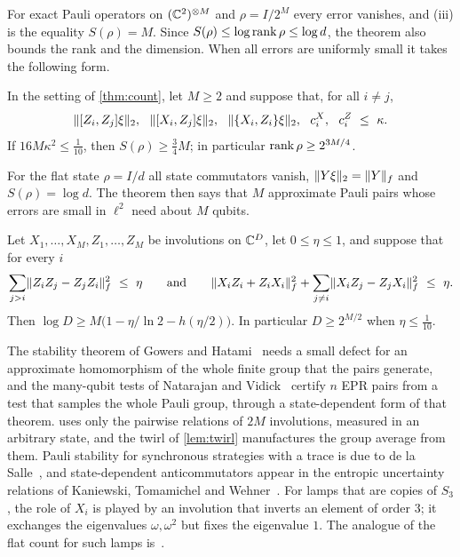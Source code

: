 For exact Pauli operators on $(\mathbb C^2)^{\otimes M}$ and $\rho=I/2^M$ every error vanishes, and (iii) is the equality $S(\rho)=M$. Since
$S(\rho)\le\log\operatorname{rank}\rho\le\log d$, the theorem also bounds the rank and the dimension. When all errors are uniformly small it takes the
following form.

\begin{corollary}\label{cor:count}
In the setting of \cref{thm:count}, let $M\ge2$ and suppose that, for all $i\ne j$,
\[
\hs{[Z_i,Z_j]\xi},\ \ \hs{[X_i,Z_j]\xi},\ \ \hs{\{X_i,Z_i\}\xi},\ \ c^X_i,\ \ c^Z_i\ \le\ \kappa .
\]
If $16M\kappa^2\le\frac1{10}$, then $S(\rho)\ge\frac34M$; in particular $\operatorname{rank}\rho\ge2^{3M/4}$.
\end{corollary}

For the flat state $\rho=I/d$ all state commutators vanish, $\lVert Y\xi\rVert_2=\lVert Y\rVert_f$ and $S(\rho)=\log d$. The theorem then says that $M$
approximate Pauli pairs whose errors are small in $\ell^2$ need about $M$ qubits.

\begin{corollary}\label{cor:count-flat}
Let $X_1,\dots,X_M,Z_1,\dots,Z_M$ be involutions on $\mathbb C^D$, let $0\le\eta\le1$, and suppose that for every $i$
\[
\sum_{j>i}\fn{Z_iZ_j-Z_jZ_i}^2\ \le\ \eta\qquad\text{and}\qquad\fn{X_iZ_i+Z_iX_i}^2+\sum_{j\ne i}\fn{X_iZ_j-Z_jX_i}^2\ \le\ \eta .
\]
Then $\log D\ge M\bigl(1-\eta/\ln2-h(\eta/2)\bigr)$. In particular $D\ge2^{M/2}$ when $\eta\le\frac1{10}$.
\end{corollary}

\begin{remark}\label{count:credits}
The stability theorem of Gowers and Hatami~\cite{GH17} needs a small defect for an approximate homomorphism of the whole finite group that
the pairs generate, and the many-qubit tests of Natarajan and Vidick~\cite{NV17} certify $n$ EPR pairs from a test that samples the whole
Pauli group, through a state-dependent form of that theorem.  uses only the pairwise relations of $2M$ involutions,
measured in an arbitrary state, and the twirl of \cref{lem:twirl} manufactures the group average from them. Pauli stability for
synchronous strategies with a trace is due to de la Salle~\cite{dlS22}, and state-dependent anticommutators appear in the entropic uncertainty relations of Kaniewski, Tomamichel and
Wehner~\cite{KTW14}. For lamps that are copies of $S_3$, the role of $X_i$ is played by an involution that inverts an element of order $3$;
it exchanges the eigenvalues $\omega,\omega^2$ but fixes the eigenvalue $1$. The analogue of the flat count for such lamps
is~\cite[Theorem~B.3]{DM-lamps}.
\end{remark}

